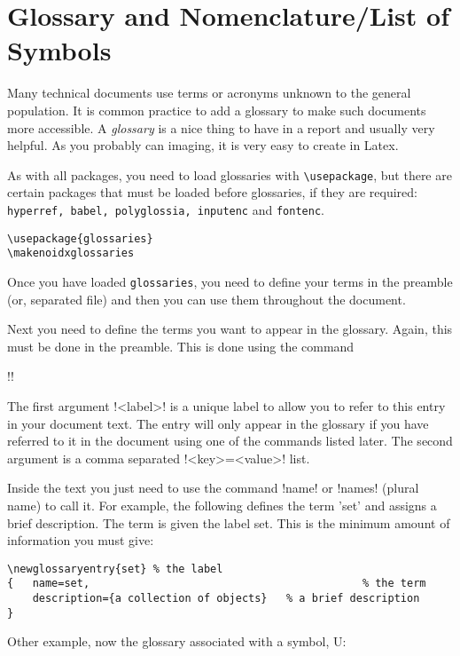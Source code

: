 \section{Glossary and Nomenclature/List of Symbols} %
\label{sec:glossary}

Many technical documents use terms or acronyms unknown to the general population. It is common practice to add a glossary to make such documents more accessible. A \textit{glossary} is a nice thing to have in a report and usually very helpful. As you probably can imaging, it is very easy to create in Latex. 

As with all packages, you need to load glossaries with \verb|\usepackage|, but there are certain packages that must be loaded before glossaries, if they are required: \texttt{hyperref, babel, polyglossia, inputenc} and \texttt{fontenc}.

\begin{verbatim}
\usepackage{glossaries} 
\makenoidxglossaries
\end{verbatim}

Once you have loaded \texttt{glossaries}, you need to define your terms in the preamble (or, separated file) and then you can use them throughout the document. 

Next you need to define the terms you want to appear in the glossary. Again, this must be done in the preamble. This is done using the command

\spverb!! 

The first argument \spverb!<label>! is a unique label to allow you to refer to this entry in your document text. The entry will only appear in the glossary if you have referred to it in the document using one of the commands listed later. The second argument is a comma separated \spverb!<key>=<value>! list.

Inside the text you just need to use the command \spverb!\gls{name}! or \spverb!\glspl{name}! (plural name) to call it. For example, the following defines the term 'set' and assigns a brief description. The term is given the label set. This is the minimum amount of information you must give:

\begin{verbatim}
\newglossaryentry{set} % the label
{	name=set,            								% the term
 	description={a collection of objects} 	% a brief description
}
 \end{verbatim}

Other example, now the glossary associated with a symbol, \gls{U}:

